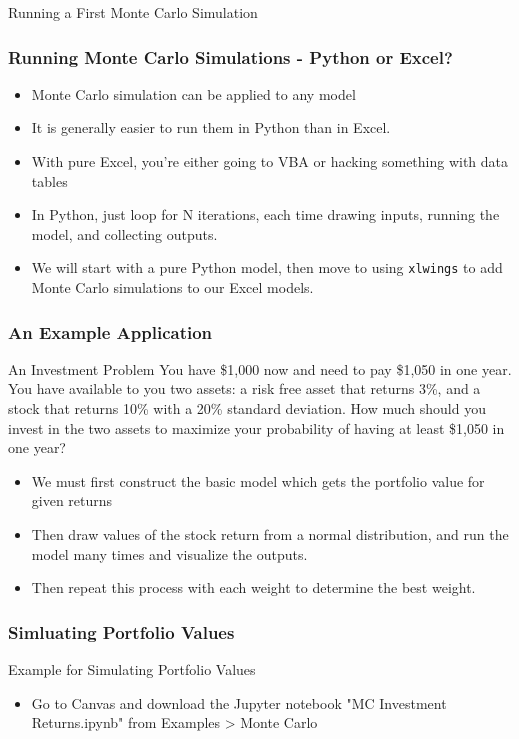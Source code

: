 \documentclass[handout, 11pt]{beamer}
\begin{document}
\begin{section}[Run MC]{Running a First Monte Carlo Simulation}
\begin{frame}
\frametitle{Running Monte Carlo Simulations - Python or Excel?}
\begin{itemize}
\item Monte Carlo simulation can be applied to any model
\vfill
\item It is generally easier to run them in Python than in Excel.
\vfill
\item With pure Excel, you're either going to VBA or hacking something with data tables
\vfill
\item In Python, just loop for N iterations, each time drawing inputs, running the model, and collecting outputs.
\vfill
\item We will start with a pure Python model, then move to using
\texttt{xlwings}
to add Monte Carlo simulations to our Excel models.
\end{itemize}
\end{frame}
\begin{frame}
\frametitle{An Example Application}
\begin{block}{An Investment Problem}
You have \$1,000 now and need to pay \$1,050 in one year. You have available to you two assets: a risk free asset that returns 3\%, and a stock that returns 10\% with a 20\% standard deviation. How much should you invest in the two assets to maximize your probability of having at least \$1,050 in one year?
\end{block}
\vfill
\begin{itemize}
\item We must first construct the basic model which gets the portfolio value for given returns
\item Then draw values of the stock return from a normal distribution, and run the model many times and visualize the outputs. 
\item Then repeat this process with each weight to determine the best weight.
\end{itemize}
\end{frame}
\begin{frame}
\frametitle{Simluating Portfolio Values}
{
\begin{block}{Example for Simulating Portfolio Values}
\begin{itemize}
\item Go to Canvas and download the Jupyter notebook "MC Investment Returns.ipynb" from Examples > Monte Carlo

\end{itemize}
\end{block}}
\end{frame}
\end{section}
\end{document}
